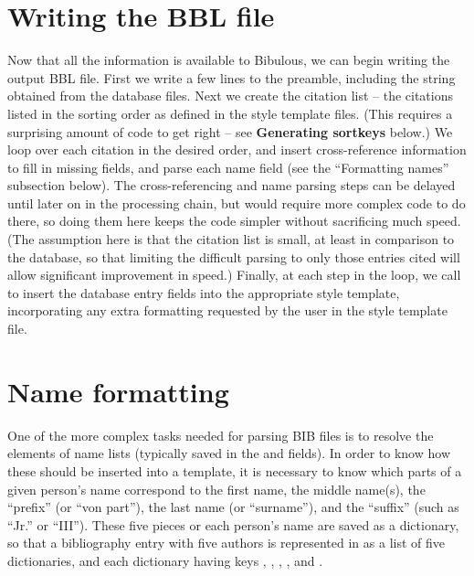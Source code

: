 \documentclass[letterpaper,10pt,english]{sphinxmanual}
\begin{document}
\section{Writing the BBL file}
\label{developer_guide:writing-the-bbl-file}
Now that all the information is available to Bibulous, we can begin writing the output BBL file. First we write a few lines to the preamble, including the  string obtained from the  database files. Next we create the citation list -- the citations listed in the sorting order as defined in the style template files. (This requires a surprising amount of code to get right -- see \textbf{Generating sortkeys} below.) We loop over each citation in the desired order, and insert cross-reference information to fill in missing fields, and parse each name field (see the ``Formatting names'' subsection below). The cross-referencing and name parsing steps can be delayed until later on in the processing chain, but would require more complex code to do there, so doing them here keeps the code simpler without sacrificing much speed. (The assumption here is that the citation list is small, at least in comparison to the database, so that limiting the difficult parsing to only those entries cited will allow significant improvement in speed.) Finally, at each step in the loop, we call  to insert the database entry fields into the appropriate style template, incorporating any extra formatting requested by the user in the style template file.


\section{Name formatting}
\label{developer_guide:name-formatting}
One of the more complex tasks needed for parsing BIB files is to resolve the elements of name lists (typically saved in the  and  fields). In order to know how these should be inserted into a template, it is necessary to know which parts of a given person's name correspond to the first name, the middle name(s), the ``prefix'' (or ``von part''), the last name (or ``surname''), and the ``suffix'' (such as ``Jr.'' or ``III''). These five pieces or each person's name are saved as a dictionary, so that a bibliography entry with five authors is represented in  as a list of five dictionaries, and each dictionary having keys , , , , and .
\end{document}
